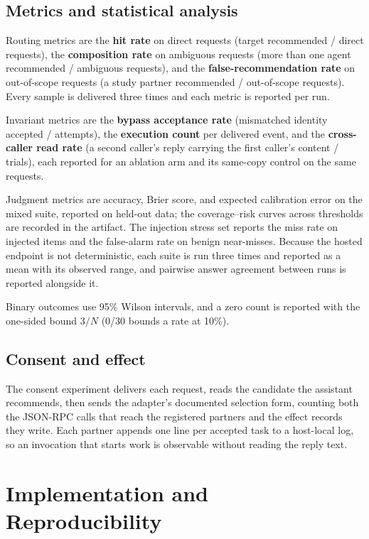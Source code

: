 \documentclass[runningheads,a4paper]{llncs}
\begin{document}
\subsection{Metrics and statistical analysis}

Routing metrics are the \textbf{hit rate} on direct requests (target recommended / direct requests), the \textbf{composition rate} on ambiguous requests (more than one agent recommended / ambiguous requests), and the \textbf{false-recommendation rate} on out-of-scope requests (a study partner recommended / out-of-scope requests). Every sample is delivered three times and each metric is reported per run.

Invariant metrics are the \textbf{bypass acceptance rate} (mismatched identity accepted / attempts), the \textbf{execution count} per delivered event, and the \textbf{cross-caller read rate} (a second caller's reply carrying the first caller's content / trials), each reported for an ablation arm and its same-copy control on the same requests.

Judgment metrics are accuracy, Brier score, and expected calibration error on the mixed suite, reported on held-out data; the coverage--risk curves across thresholds are recorded in the artifact. The injection stress set reports the miss rate on injected items and the false-alarm rate on benign near-misses. Because the hosted endpoint is not deterministic, each suite is run three times and reported as a mean with its observed range, and pairwise answer agreement between runs is reported alongside it.

Binary outcomes use 95\% Wilson intervals, and a zero count is reported with the one-sided bound \(3/N\) (0/30 bounds a rate at 10\%).

\subsection{Consent and effect}

The consent experiment delivers each request, reads the candidate the assistant recommends, then sends the adapter's documented selection form, counting both the JSON-RPC calls that reach the registered partners and the effect records they write. Each partner appends one line per accepted task to a host-local log, so an invocation that starts work is observable without reading the reply text.

\section{Implementation and Reproducibility}
\end{document}
